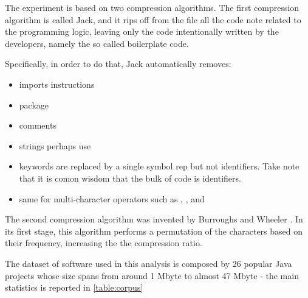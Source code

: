 
The experiment is based on two compression algorithms.
The first compression algorithm is called Jack, and it rips off from the file all the code note related to the programming logic, leaving
only the code intentionally written by the developers, namely the so called boilerplate code.

Specifically, in order to do that, Jack automatically removes:

\begin{itemize}
\item imports instructions
\item package
\item comments
\item strings perhaps use
\item keywords are replaced by a single symbol rep
but not identifiers. Take note that it is comon wisdom that the bulk of code is identifiers.
\item same for multi-character operators such as \cc{->}, \cc{[]}, and \cc{<<<<=}
\end{itemize}

The second compression algorithm was invented by Burroughs and Wheeler \cite{Burrows:Wheeler:94}.
In its first stage, this algorithm performs a permutation of the characters based on their frequency, increasing the 
the compression ratio.  

The dataset of software used in this analysis is composed by 26 popular Java
projects whose size spans from around 1 Mbyte to almost 47 Mbyte - the main
statistics is reported in \cref{table:corpus}

\begin{table}
  \label{table:corpus}
  \caption{The results of the compression using the Burroughs-Wheeler algorithm}
  \centering
\end{table}
